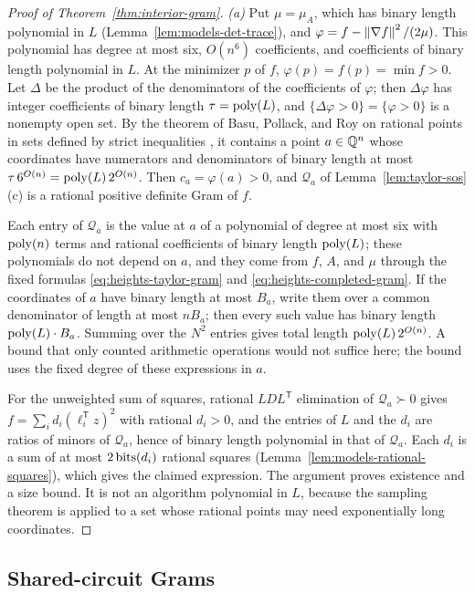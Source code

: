 \begin{proof}[Proof of Theorem~\ref{thm:interior-gram}]
\emph{(a)} Put $\mu=\mu_A$, which has binary length polynomial in $L$
(Lemma~\ref{lem:models-det-trace}), and
$\varphi=f-\left\lVert\nabla f\right\rVert^2/(2\mu)$. This polynomial has degree at most six,
$O(n^6)$ coefficients, and coefficients of binary length polynomial in $L$.
At the minimizer $p$ of $f$, $\varphi(p)=f(p)=\min f>0$. Let $\Delta$ be the
product of the denominators of the coefficients of $\varphi$; then
$\Delta\varphi$ has integer coefficients of binary length $\tau=\operatorname{poly}(L)$, and
$\{\Delta\varphi>0\}=\{\varphi>0\}$ is a nonempty open set. By the theorem of
Basu, Pollack, and Roy on rational points in sets defined by strict
inequalities \cite[Theorem~4.1.2]{BasuPollackRoy1996}, it contains a point
$a\in\mathbb Q^n$ whose coordinates have numerators and denominators of binary length
at most $\tau\,6^{O(n)}=\operatorname{poly}(L)\,2^{O(n)}$. Then $c_a=\varphi(a)>0$, and
$\mathcal Q_a$ of Lemma~\ref{lem:taylor-sos}(c) is a rational positive
definite Gram of $f$.

Each entry of $\mathcal Q_a$ is the value at $a$ of a polynomial of degree at
most six with $\operatorname{poly}(n)$ terms and rational coefficients of binary length
$\operatorname{poly}(L)$; these polynomials do not depend on $a$, and they come from $f$,
$A$, and $\mu$ through the fixed formulas \eqref{eq:heights-taylor-gram} and
\eqref{eq:heights-completed-gram}. If the coordinates of $a$ have binary
length at most $B_a$, write them over a common denominator of length at most
$nB_a$; then every such value has binary length $\operatorname{poly}(L)\cdot B_a$. Summing
over the $N^2$ entries gives total length $\operatorname{poly}(L)\,2^{O(n)}$. A bound that
only counted arithmetic operations would not suffice here; the bound uses the
fixed degree of these expressions in $a$.

For the unweighted sum of squares, rational $LDL^{\mathsf T}$ elimination of
$\mathcal Q_a\succ0$ gives $f=\sum_i d_i(\ell_i^{\mathsf T}z)^2$ with rational
$d_i>0$, and the entries of $L$ and the $d_i$ are ratios of minors of
$\mathcal Q_a$, hence of binary length polynomial in that of $\mathcal Q_a$.
Each $d_i$ is a sum of at most $2\operatorname{bits}(d_i)$ rational squares
(Lemma~\ref{lem:models-rational-squares}), which gives the claimed
expression. The argument proves existence and a size bound. It is not an
algorithm polynomial in $L$, because the sampling theorem is applied to a set
whose rational points may need exponentially long coordinates.
\end{proof}

\subsection{Shared-circuit Grams}
\label{app:heights-circuit}

